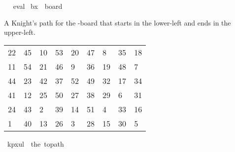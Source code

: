 \begin{isabellebody}
\isadelimproof
\ %
\endisadelimproof
%
\isatagproof
{}\isamarkupfalse%
\ eval%
\endisatagproof
{\isafoldproof}%
%
\isadelimproof
%
\endisadelimproof
\isanewline
\isanewline
{}\isamarkupfalse%
\ {\isachardoublequoteopen}b{}x{}\ {\isasymequiv}\ board\ {}\ {}{\isachardoublequoteclose}%
\begin{isamarkuptext}%
A Knight's path for the -board that starts in the lower-left and ends in the 
upper-left.
  \begin{table}[H]
    \begin{tabular}{lllllllll}
      22 & 45 & 10 & 53 & 20 & 47 &  8 & 35 & 18 \\
      11 & 54 & 21 & 46 &  9 & 36 & 19 & 48 &  7 \\
      44 & 23 & 42 & 37 & 52 & 49 & 32 & 17 & 34 \\
      41 & 12 & 25 & 50 & 27 & 38 & 29 &  6 & 31 \\
      24 & 43 &  2 & 39 & 14 & 51 &  4 & 33 & 16 \\
       1 & 40 & 13 & 26 &  3 & 28 & 15 & 30 &  5
    \end{tabular}
  \end{table}%
\end{isamarkuptext}\isamarkuptrue%
\isamarkupfalse%
\ {\isachardoublequoteopen}kp{}x{}ul\ {\isasymequiv}\ the\ {\isacharparenleft}{\kern0pt}to{\isacharunderscore}{\kern0pt}path\ \isanewline
\ \ {\isacharbrackleft}{\kern0pt}{\isacharbrackleft}{\kern0pt}{}{}{\isacharcomma}{\kern0pt}{}{}{\isacharcomma}{\kern0pt}{}{}{\isacharcomma}{\kern0pt}{}{}{\isacharcomma}{\kern0pt}{}{}{\isacharcomma}{\kern0pt}{}{}{\isacharcomma}{\kern0pt}{}{\isacharcomma}{\kern0pt}{}{}{\isacharcomma}{\kern0pt}{}{}{\isacharbrackright}{\kern0pt}{\isacharcomma}{\kern0pt}\isanewline
\ \ {\isacharbrackleft}{\kern0pt}{}{}{\isacharcomma}{\kern0pt}{}{}{\isacharcomma}{\kern0pt}{}{}{\isacharcomma}{\kern0pt}{}{}{\isacharcomma}{\kern0pt}{}{\isacharcomma}{\kern0pt}{}{}{\isacharcomma}{\kern0pt}{}{}{\isacharcomma}{\kern0pt}{}{}{\isacharcomma}{\kern0pt}{}{\isacharbrackright}{\kern0pt}{\isacharcomma}{\kern0pt}\isanewline

\end{isabellebody}
